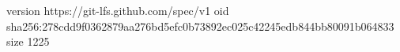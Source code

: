 version https://git-lfs.github.com/spec/v1
oid sha256:278cdd9f0362879aa276bd5efc0b73892ec025c42245edb844bb80091b064833
size 1225
